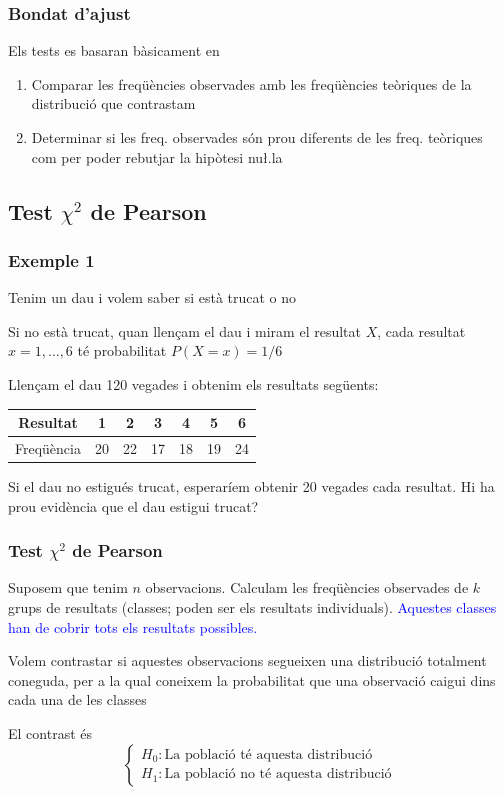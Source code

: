 \documentclass[12pt,t]{beamer}
\newcommand{\blue}[1]{\textcolor{blue}{#1}}
\renewcommand{\emph}[1]{{\color{red}#1}}
\theoremstyle{plain}
\theoremstyle{definition}
\begin{document}
\begin{frame}

\frametitle{Bondat d'ajust}

Els tests es basaran bàsicament en
\medskip

\begin{enumerate}
\item Comparar les \emph{freqüències observades} amb les \emph{freqüències teòriques} de la distribució que contrastam
\medskip

\item Determinar si les freq. observades són prou diferents de les freq. teòriques com per poder rebutjar la hipòtesi nu\l.la
\end{enumerate}


 \end{frame}


\subsection{Test $\chi^2$ de Pearson}

\begin{frame}
\frametitle{Exemple 1}
Tenim un dau i volem saber si està trucat o no
\medskip

Si no està trucat, quan llençam el dau i miram el resultat $X$, cada resultat $x=1,\ldots,6$ té probabilitat $P(X=x)=1/6$
\medskip

Llençam el dau 120 vegades i obtenim els resultats següents:
\begin{center}
\begin{tabular}{c|cccccc}
Resultat & 1 & 2 & 3 & 4 & 5 & 6\\
           \hline 
Freqüència & 20 & 22 & 17 & 18 & 19 & 24\\
\end{tabular}
\end{center}
Si el dau no estigués trucat, esperaríem obtenir 20 vegades cada resultat. Hi ha prou evidència que el dau estigui trucat?
\end{frame}




\begin{frame}
\frametitle{Test $\chi^2$ de Pearson}

Suposem que tenim $n$ observacions. Calculam 
les freqüències observades de $k$ grups de resultats (\emph{classes}; poden ser els resultats individuals). \blue{Aquestes classes han de cobrir tots els resultats possibles.}
\medskip

Volem contrastar si aquestes observacions segueixen una distribució totalment coneguda, per a la qual coneixem la probabilitat  que una observació caigui dins cada una de les classes
\medskip

El contrast és
$$
\left\{\begin{array}{l}
H_{0}: \mbox{La població té aquesta distribució }\\
H_{1}: \mbox{La població no té aquesta distribució}
\end{array}
\right.
$$

\end{frame}
\end{document}
